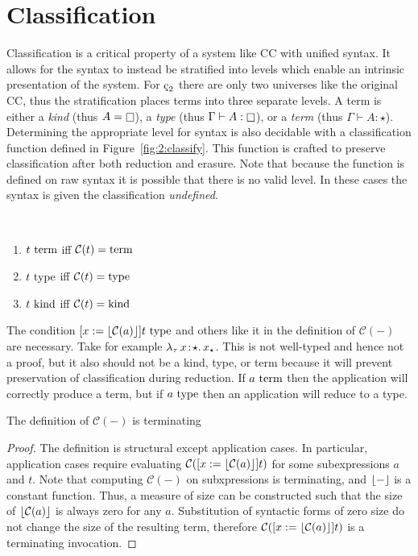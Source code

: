 \section{Classification}



Classification is a critical property of a system like CC with unified syntax.
It allows for the syntax to instead be stratified into levels which enable an intrinsic presentation of the system.
For $\ced$ there are only two universes like the original CC, thus the stratification places terms into three separate levels.
A term is either a \textit{kind} (thus $A = \kind$), a \textit{type} (thus $\Gamma \vdash A : \kind$), or a \textit{term} (thus $\Gamma \vdash A : \star$).
Determining the appropriate level for syntax is also decidable with a classification function defined in Figure~\ref{fig:2:classify}.
This function is crafted to preserve classification after both reduction and erasure.
Note that because the function is defined on raw syntax it is possible that there is no valid level.
In these cases the syntax is given the classification \textit{undefined}.

\begin{definition}
    \textcolor{white}{\_}
    \begin{enumerate}
        \item $t~\textnormal{term}$ iff $\mathcal{C}(t) =\!\!~\textnormal{term}$
        \item $t~\textnormal{type}$ iff $\mathcal{C}(t) =\!\!~\textnormal{type}$
        \item $t~\textnormal{kind}$ iff $\mathcal{C}(t) =\!\!~\textnormal{kind}$
    \end{enumerate}
\end{definition}

The condition $[x := \lfloor \mathcal{C}(a) \rfloor]t~\textnormal{type}$ and others like it in the definition of $\mathcal{C}(-)$ are necessary.
Take for example ${\lambda_\tau}\, x\! : \! \star.\, x_\star$.
This is not well-typed and hence not a proof, but it also should not be a kind, type, or term because it will prevent preservation of classification during reduction.
If $a~\textnormal{term}$ then the application will correctly produce a term, but if $a~\textnormal{type}$ then an application will reduce to a type.

\begin{lemma}
    The definition of $\mathcal{C}(-)$ is terminating
\end{lemma}
\begin{proof}
    The definition is structural except application cases.
    In particular, application cases require evaluating $\mathcal{C}([x := \lfloor \mathcal{C}(a) \rfloor]t)$ for some subexpressions $a$ and $t$.
    Note that computing $\mathcal{C}(-)$ on subxpressions is terminating, and $\lfloor - \rfloor$ is a constant function.
    Thus, a measure of size can be constructed such that the size of $\lfloor \mathcal{C}(a) \rfloor$ is always zero for any $a$.
    Substitution of syntactic forms of zero size do not change the size of the resulting term, therefore $\mathcal{C}([x := \lfloor \mathcal{C}(a) \rfloor]t)$ is a terminating invocation.
\end{proof}

